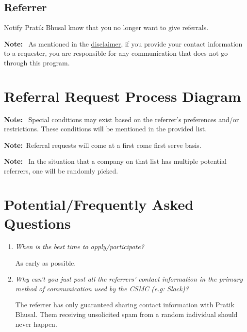 \documentclass[letterpaper, 12pt]{article}
\newcommand{\QA}[2]{\textit{#1}

    \begin{doublespace}#2\end{doublespace}
}
\newcommand{\note}[1]{\textbf{Note:}~#1}
\begin{document}
\subsection{Referrer}

Notify Pratik Bhusal know that you no longer want to give referrals.

\note{%
    As mentioned in the \hyperref[section:disclaimer:spamMessages]{disclaimer},
    if you provide your contact information to a requester, you are responsible
    for any communication that does not go through this program.
}

\section{Referral Request Process Diagram}

\label{fig:requestProcess}

\note{%
    Special conditions may exist based on the referrer's preferences and/or
    restrictions. These conditions will be mentioned in the provided list.
}

\note{Referral requests will come at a first come first serve basis.}

\note{%
    In the situation that a company on that list has multiple potential
    referrers, one will be randomly picked.
}

\section{Potential/Frequently Asked Questions}

\begin{enumerate}
    \item\QA%
        {When is the best time to apply/participate?}
        {As early as possible.}
    \item\QA%
        {%
            Why can't you just post all the referrers' contact information in the
            primary method of communication used by the CSMC (e.g: Slack)?
        }
        {%
            The referrer has only guaranteed sharing contact information with
            Pratik Bhusal. Them receiving unsolicited spam from a random
            individual should never happen.
        }
\end{enumerate}
\end{document}
